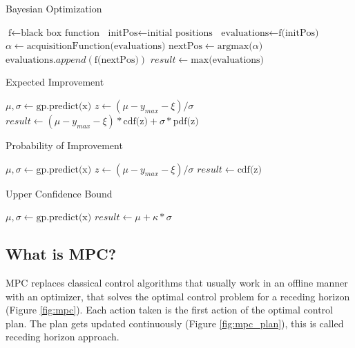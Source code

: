 \documentclass[twoside,twocolumn]{article}
\begin{document}
\begin{algorithm}
    \caption{Bayesian Optimization}
    \label{alg:bo}
    \begin{algorithmic}
        \State $\text{f} \gets \text{black box function}$
        \State $\text{initPos} \gets \text{initial positions}$
        \State $\text{evaluations} \gets \text{f(initPos)}$
            \State $\alpha \gets \text{acquisitionFunction(evaluations)}$
            \State $\text{nextPos} \gets \text{argmax(}\alpha\text{)}$
            \State $\text{evaluations}.append(\text{f(nextPos)})$
        \EndFor
        \State $result \gets \text{max(evaluations)}$
    \end{algorithmic}
\end{algorithm}

\begin{algorithm}
    \caption{Expected Improvement}
    \label{alg:ei}
    \begin{algorithmic}
        \State $\mu, \sigma \gets \text{gp.predict(x)}$
        \State $z \gets (\mu - y_{max} - \xi)/\sigma$
        \State $result \gets (\mu - y_{max} - \xi) * \text{cdf(z)} + \sigma * \text{pdf(z)}$
    \end{algorithmic}
\end{algorithm}

\begin{algorithm}
    \caption{Probability of Improvement}
    \label{alg:poi}
    \begin{algorithmic}
        \State $\mu, \sigma \gets \text{gp.predict(x)}$
        \State $z \gets (\mu - y_{max} - \xi)/\sigma$
        \State $result \gets \text{cdf(z)}$
    \end{algorithmic}
\end{algorithm}

\begin{algorithm}
    \caption{Upper Confidence Bound}
    \label{alg:ucb}
    \begin{algorithmic}
        \State $\mu, \sigma \gets \text{gp.predict(x)}$
        \State $result \gets \mu + \kappa * \sigma$
    \end{algorithmic}
\end{algorithm}

\subsection{What is MPC?}
MPC replaces classical control algorithms that usually work in an offline manner with an optimizer, that solves the optimal control problem for a receding horizon (Figure \ref{fig:mpc}).
Each action taken is the first action of the optimal control plan.
The plan gets updated continuously (Figure \ref{fig:mpc_plan}), this is called receding horizon approach.
\end{document}
